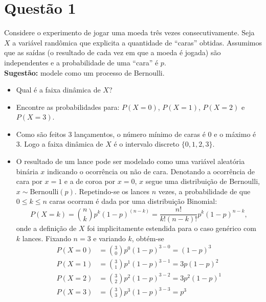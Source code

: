 \section{Questão 1}
Considere o experimento de jogar uma moeda três vezes consecutivamente. 
Seja $X$ a variável randômica que explicita a quantidade de ``caras'' obtidas. 
Assumimos que as saídas (o resultado de cada vez em que a moeda é jogada) 
são independentes e a probabilidade de uma ``cara'' é $p$. \\

\textbf{\sffamily \color{vermelhoescuro} Sugestão:} 
modele como um processo de Bernoulli.

\begin{itemize}
    \item [a)] 
    Qual é a faixa dinâmica de $X$?
    
    \item [b)] 
    Encontre as probabilidades para: 
    $P(X = 0)$, 
    $P(X = 1)$, 
    $P(X = 2)$ e 
    $P(X = 3)$.
\end{itemize}

\respostas
\begin{itemize}
    \item [a)]
    Como são feitos 3 lançamentos, o número mínimo de caras é 0 e o máximo é 3.
    Logo a faixa dinâmica de $X$ é o intervalo discreto $\{0, 1, 2, 3\}$.

    \item [b)]
    O resultado de um lance pode ser modelado como uma variável aleatória binária $x$ indicando o ocorrência ou não de cara.
    Denotando a ocorrência de cara por $x=1$ e a de coroa por $x=0$, $x$ segue uma distribuição de Bernoulli, $x\sim \mathrm{Bernoulli}(p)$.
    Repetindo-se os lances $n$ vezes, a probabilidade de que $0 \leq k \leq n$ caras ocorram é dada por uma distribuição Binomial:
    \begin{equation}
        P(X = k) 
        = \binom{n}{k} p^k (1-p)^{(n-k)}
        = \frac{n!}{k!(n-k)!} p^k (1-p)^{n-k},
    \end{equation}
    onde a definição de $X$ foi implicitamente estendida para o caso genérico com $k$ lances. 
    Fixando $n=3$ e variando $k$, obtém-se
    \begin{align}
        P(X = 0) &= \binom{3}{0} p^0 (1-p)^{3-0} = (1-p)^3 \\
        P(X = 1) &= \binom{3}{1} p^1 (1-p)^{3-1} = 3p(1-p)^2 \\
        P(X = 2) &= \binom{3}{2} p^2 (1-p)^{3-2} = 3p^2(1-p)^1 \\
        P(X = 3) &= \binom{3}{3} p^3 (1-p)^{3-3} = p^3
    \end{align}
\end{itemize}